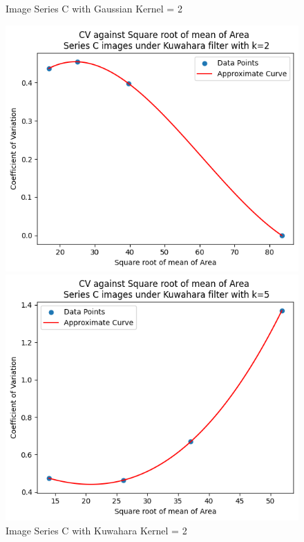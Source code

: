 \documentclass[runningheads]{llncs}
\begin{document}
\begin{figure}[h!]
\begin{minipage}[h]{0.47\linewidth}
\begin{center}
\caption{Image Series C with Gaussian Kernel = 2}
\label{SeriesC-Gaussian-Kernel5-AreaGraph}
\end{center}
\end{minipage}
\vfill
\vspace{0.2 cm}
\begin{minipage}[h]{0.47\linewidth}
\begin{center}
\includegraphics[width=1\linewidth]{Report/Result_Images/series_C_Kuwahara_kernel_2_area.png} 
\caption{Image Series C with Kuwahara Kernel = 2}
\label{SeriesC-Kuwahara-Kernel2-AreaGraph}
\end{center}
\end{minipage}
\hfill
\begin{minipage}[h]{0.47\linewidth}
\begin{center}
\includegraphics[width=1\linewidth]{Report/Result_Images/series_C_Kuwahara_kernel_5_area.png} 

\end{center}
\end{minipage}
\end{figure}
\end{document}
